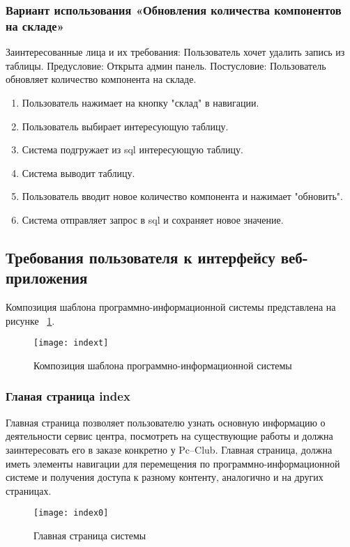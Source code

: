 \subsubsection{Вариант использования «Обновления количества компонентов на складе»}
Заинтересованные лица и их требования: Пользователь хочет удалить запись из таблицы.
Предусловие: Открыта админ панель.
Постусловие: Пользователь обновляет количество компонента на складе.
\begin{enumerate}
	\item Пользователь нажимает на кнопку "склад" в навигации.
	\item Пользователь выбирает интересующую таблицу.
	\item Система подгружает из sql интересующую таблицу.
	\item Система выводит таблицу.
	\item Пользователь вводит новое количество компонента и нажимает "обновить".
	\item Система отправляет запрос в sql и сохраняет новое значение.
\end{enumerate}
\newpage
\subsection{Требования пользователя к интерфейсу веб-приложения}

Композиция шаблона программно-информационной системы представлена на рисунке ~\ref{indext:image}.

\begin{figure}[ht]
\texttt{[image: indext]}
\caption{Композиция шаблона программно-информационной системы}
\label{indext:image}
\end{figure}

\subsubsection{Гланая страница index}

Главная страница позволяет пользователю узнать основную информацию о деятельности сервис центра, посмотреть на существующие работы и должна заинтересовать его в заказе конкретно у Pc--Club. Главная страница, должна иметь элементы навигации для перемещения по программно-информационной системе и получения доступа к разному контенту, аналогично и на других страницах.

\begin{figure}[ht]
	\texttt{[image: index0]}
	\caption{Главная страница системы}
	\label{indext:index0}
\end{figure}

